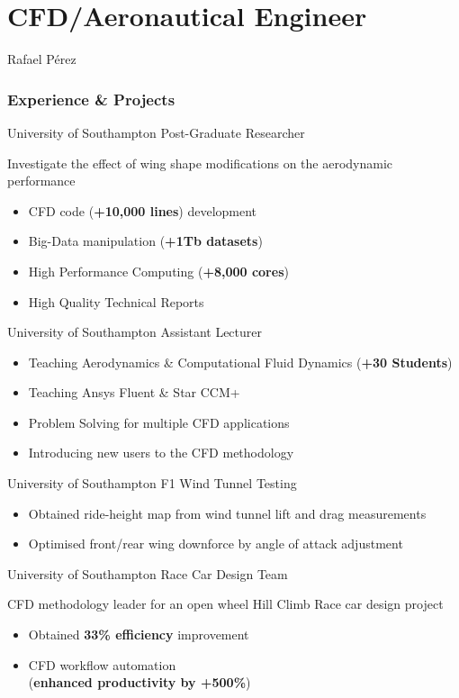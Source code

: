 \documentclass[fontsize=10pt]{tccv}
\begin{document}
\part{CFD/Aeronautical Engineer}{Rafael P\'erez}

\section{Experience \& Projects}
\begin{eventlist}
     {University of Southampton}
     {Post-Graduate Researcher}

Investigate the effect of wing shape modifications on
the aerodynamic performance
\begin{itemize}
	\itemsep -1pt
	\item CFD code (\textbf{+10,000 lines}) development
	\item Big-Data manipulation (\textbf{+1Tb datasets})
	\item High Performance Computing (\textbf{+8,000 cores})
	\item High Quality Technical Reports
\end{itemize}

	{University of Southampton}
	{Assistant Lecturer}
\begin{itemize}
	\itemsep -1pt
	\item Teaching Aerodynamics \& Computational Fluid Dynamics (\textbf{+30 Students})
	\item Teaching Ansys Fluent \& Star CCM+
	\item Problem Solving for multiple CFD applications
	\item Introducing new users to the CFD methodology
\end{itemize}

     {University of Southampton}
     {F1 Wind Tunnel Testing}
     \begin{itemize}
	\itemsep -1pt
     	\item Obtained ride-height map from wind tunnel lift and drag measurements
     	\item Optimised front/rear wing downforce by angle of attack adjustment
     \end{itemize}

     {University of Southampton}
     {Race Car Design Team}

CFD methodology leader for an open wheel Hill Climb Race car design project
     \begin{itemize}
	\itemsep -1pt
     	\item Obtained \textbf{33\% efficiency} improvement
     	\item CFD workflow automation \\(\textbf{enhanced productivity by +500\%})
     \end{itemize}


\end{eventlist}
\end{document}
